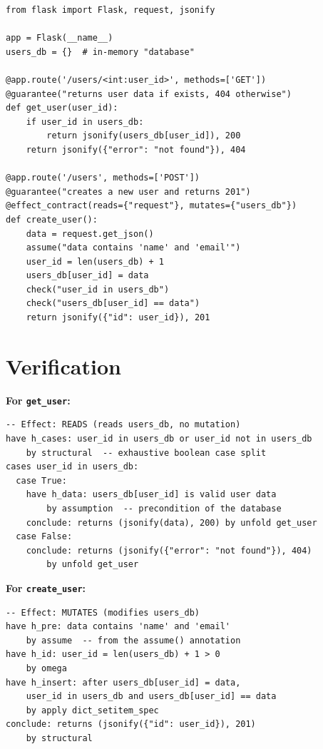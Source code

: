 \documentclass[11pt,a4paper]{report}
\theoremstyle{definition}
\theoremstyle{plain}
\begin{document}
\begin{lstlisting}[style=synhopy]
from flask import Flask, request, jsonify

app = Flask(__name__)
users_db = {}  # in-memory "database"

@app.route('/users/<int:user_id>', methods=['GET'])
@guarantee("returns user data if exists, 404 otherwise")
def get_user(user_id):
    if user_id in users_db:
        return jsonify(users_db[user_id]), 200
    return jsonify({"error": "not found"}), 404

@app.route('/users', methods=['POST'])
@guarantee("creates a new user and returns 201")
@effect_contract(reads={"request"}, mutates={"users_db"})
def create_user():
    data = request.get_json()
    assume("data contains 'name' and 'email'")
    user_id = len(users_db) + 1
    users_db[user_id] = data
    check("user_id in users_db")
    check("users_db[user_id] == data")
    return jsonify({"id": user_id}), 201
\end{lstlisting}

\section{Verification}

\textbf{For \texttt{get\_user}:}
\begin{lstlisting}[style=proof]
-- Effect: READS (reads users_db, no mutation)
have h_cases: user_id in users_db or user_id not in users_db
    by structural  -- exhaustive boolean case split
cases user_id in users_db:
  case True:
    have h_data: users_db[user_id] is valid user data
        by assumption  -- precondition of the database
    conclude: returns (jsonify(data), 200) by unfold get_user
  case False:
    conclude: returns (jsonify({"error": "not found"}), 404)
        by unfold get_user
\end{lstlisting}

\textbf{For \texttt{create\_user}:}
\begin{lstlisting}[style=proof]
-- Effect: MUTATES (modifies users_db)
have h_pre: data contains 'name' and 'email'
    by assume  -- from the assume() annotation
have h_id: user_id = len(users_db) + 1 > 0
    by omega
have h_insert: after users_db[user_id] = data,
    user_id in users_db and users_db[user_id] == data
    by apply dict_setitem_spec
conclude: returns (jsonify({"id": user_id}), 201)
    by structural
\end{lstlisting}
\end{document}
